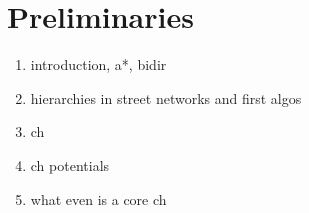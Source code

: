 
\chapter{Preliminaries}
\label{ch:preliminaries}

\begin{enumerate}
	\item introduction, a*, bidir
	\item hierarchies in street networks and first algos
	\item ch
	\item ch potentials
	\item what even is a core ch
\end{enumerate}